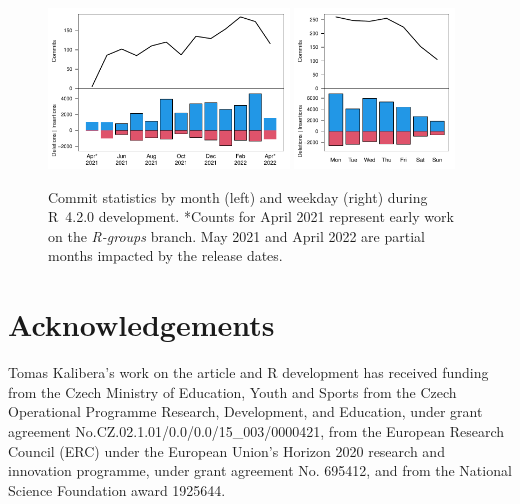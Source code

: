 \begin{figure}[htb]
\centering
\includegraphics[width=0.57\textwidth]{svnplot_mon42}
\includegraphics[width=0.38\textwidth]{svnplot_wd42}
\caption{Commit statistics by month (left) and weekday (right) during
R~4.2.0 development.  *Counts for April 2021 represent early work on the
\emph{R-groups} branch.
May 2021 and April 2022 are partial months impacted by the release dates.}
\label{fig:svn42}
\end{figure}


\section{Acknowledgements}
Tomas Kalibera's work on the article and R development has received funding
from the Czech Ministry of Education, Youth and Sports from the Czech
Operational Programme Research, Development, and Education, under grant
agreement No.CZ.02.1.01/0.0/0.0/15\_003/0000421, from the European Research
Council (ERC) under the European Union's Horizon 2020 research and
innovation programme, under grant agreement No.  695412, and from the
National Science Foundation award 1925644.

\begin{samepage}
\address{Tomas Kalibera \\
  Czech Technical University, Czech Republic \\
  }

\address{Sebastian Meyer \\
  Friedrich-Alexander-Universit\"at Erlangen-N\"urnberg, Germany \\
  }

\address{Kurt Hornik \\
  WU Wirtschaftsuniversit\"at Wien, Austria \\
  }

\end{samepage}
